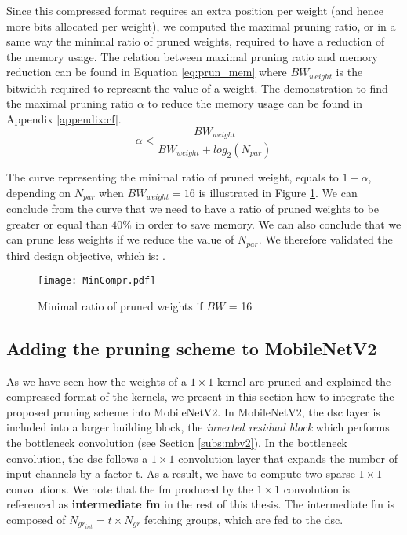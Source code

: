 Since this compressed format requires an extra position per weight (and hence more bits allocated per weight), we computed the maximal pruning ratio, or in a same way the minimal ratio of pruned weights, required to have a reduction of the memory usage. The relation between maximal pruning ratio and memory reduction can be found in Equation \eqref{eq:prun_mem} where $BW_{weight}$ is the bitwidth required to represent the value of a weight. The demonstration to find the maximal pruning ratio $\alpha$ to reduce the memory usage can be found in Appendix \ref{appendix:cf}.
%
\begin{equation}
    \alpha < \frac{BW_{weight}}{ BW_{weight} + log_2(N_{par})}
    \label{eq:prun_mem}
\end{equation}

The curve representing the minimal ratio of pruned weight, equals to $1 - \alpha$, depending on $N_{par}$ when $BW_{weight} = 16$ is illustrated in Figure \ref{fig:prun_mem}. We can conclude from the curve that we need to have a ratio of pruned weights to be greater or equal than $40\%$ in order to save memory. We can also conclude that we can prune less weights if we reduce the value of $N_{par}$. We therefore validated the third design objective, which is: \textbf{}.
%
\begin{figure}[H]
    \centering
    \texttt{[image: MinCompr.pdf]}
    \caption{Minimal ratio of pruned weights if $BW$ = 16}
    \label{fig:prun_mem}
\end{figure}
%
\subsection{Adding the pruning scheme to MobileNetV2} \label{subsec:mbnv2-pr}
%
As we have seen how the weights of a $1 \times 1$ kernel are pruned and explained the compressed format of the kernels, we present in this section how to integrate the proposed pruning scheme into MobileNetV2. In MobileNetV2, the \acrshort{dsc} layer is included into a larger building block, the \textit{inverted residual block} which performs the bottleneck convolution (see Section \ref{subs:mbv2}). In the bottleneck convolution, the \acrshort{dsc} follows a $1 \times 1$ convolution layer that expands the number of input channels by a factor t. As a result, we have to compute two sparse $1 \times 1$ convolutions. We note that the \acrshort{fm} produced by the $1 \times 1$ convolution is referenced as \textbf{intermediate \acrshort{fm}} in the rest of this thesis. The intermediate \acrshort{fm} is composed of $N_{gr_{int}} = t \times N_{gr}$ fetching groups, which are fed to the \acrshort{dsc}.

